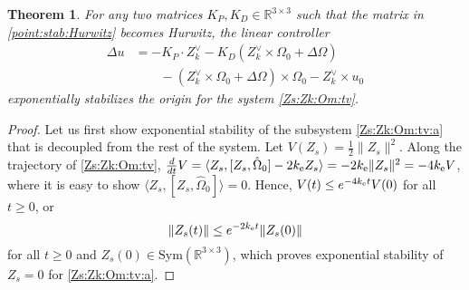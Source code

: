 \documentclass[letterpaper, 10 pt, conference]{ieeeconf}  %
\newtheorem{theorem}{Theorem}[section]
\newcommand{\Sym}{\mathrm{Sym}}
\newcommand{\coV}{{k_{\rm e}}}
\begin{document}
\begin{theorem}\label{theorem:delta:1}
For any two matrices $K_P, K_D \in \mathbb R^{3\times 3}$ such that the matrix in \eqref{point:stab:Hurwitz} becomes Hurwitz,  the linear controller
\begin{align}
\Delta u &= -K_P \cdot Z_k^\vee - K_D (Z_k^\vee \times \Omega_0 + \Delta \Omega )  \nonumber \\
&\quad\quad - (Z_k^\vee \times \Omega_0 + \Delta \Omega )\times \Omega_0 - Z_k^\vee \times u_0 \label{Delta:u:rigid}
\end{align}
exponentially stabilizes the origin for the system \eqref{Zs:Zk:Om:tv}. 
\end{theorem}
\begin{proof}
Let us first show exponential stability of the subsystem \eqref{Zs:Zk:Om:tv:a} that is decoupled from the rest of the system. Let $V(Z_s) = \frac{1}{2}\|Z_s\|^2$. Along the trajectory of  \eqref{Zs:Zk:Om:tv}, $\frac{d}{dt}V = \langle Z_s, [Z_s, \hat\Omega_0]  - 2\coV Z_s\rangle = -2\coV \|Z_s\|^2 = -4\coV V$, where it is easy to show $\langle Z_s, [Z_s, \hat\Omega_0]  \rangle = 0$. Hence, $V(t) \leq e^{-4\coV t}V(0)$ for all $t\geq 0$, or 
\begin{equation}\label{Zs:exp}
\|Z_s(t)\| \leq e^{-2\coV t} \|Z_s(0)\|
\end{equation} 
for all $t\geq 0$ and $Z_s(0) \in \Sym(\mathbb R^{3\times 3})$, which proves exponential stability of $Z_s = 0$ for  \eqref{Zs:Zk:Om:tv:a}.


\end{proof}
\end{document}
